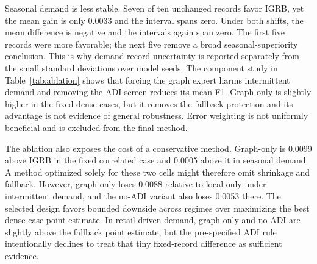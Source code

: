 Seasonal demand is less stable. Seven of ten unchanged records favor IGRB, yet the mean gain is only 0.0033 and the interval spans zero. Under both shifts, the mean difference is negative and the intervals again span zero. The first five records were more favorable; the next five remove a broad seasonal-superiority conclusion. This is why demand-record uncertainty is reported separately from the small standard deviations over model seeds.
The component study in Table~\ref{tab:ablation} shows that forcing the graph expert harms intermittent demand and removing the ADI screen reduces its mean F1. Graph-only is slightly higher in the fixed dense cases, but it removes the fallback protection and its advantage is not evidence of general robustness. Error weighting is not uniformly beneficial and is excluded from the final method.
\begin{table}[tb]\centering\scriptsize
\caption{Component ablations on the unchanged fixed realization (mean $\pm$ standard deviation over five model seeds).}\label{tab:ablation}
\end{table}
The ablation also exposes the cost of a conservative method. Graph-only is 0.0099 above IGRB in the fixed correlated case and 0.0005 above it in seasonal demand. A method optimized solely for these two cells might therefore omit shrinkage and fallback. However, graph-only loses 0.0088 relative to local-only under intermittent demand, and the no-ADI variant also loses 0.0053 there. The selected design favors bounded downside across regimes over maximizing the best dense-case point estimate. In retail-driven demand, graph-only and no-ADI are slightly above the fallback point estimate, but the pre-specified ADI rule intentionally declines to treat that tiny fixed-record difference as sufficient evidence.

